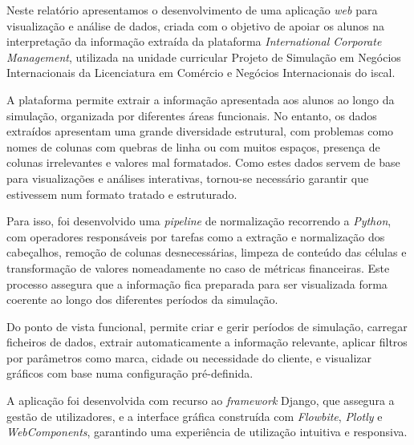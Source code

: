 




Neste relatório apresentamos o desenvolvimento de uma aplicação \textit{web} para visualização e análise de dados, criada com o objetivo de apoiar os alunos na interpretação da informação extraída da plataforma \textit{International Corporate Management}, utilizada na unidade curricular Projeto de Simulação em Negócios Internacionais da Licenciatura em Comércio e Negócios Internacionais do \gls{iscal}.

A plataforma permite extrair a informação apresentada aos alunos ao longo da simulação, organizada por diferentes áreas funcionais. No entanto, os dados extraídos apresentam uma grande diversidade estrutural, com problemas como nomes de colunas com quebras de linha ou com muitos espaços, presença de colunas irrelevantes e valores mal formatados. Como estes dados servem de base para visualizações e análises interativas, tornou-se necessário garantir que estivessem num formato tratado e estruturado. 

Para isso, foi desenvolvido uma \textit{pipeline} de normalização recorrendo a \textit{Python}, com operadores responsáveis por tarefas como a extração e normalização dos cabeçalhos, remoção de colunas desnecessárias, limpeza de conteúdo das células e transformação de valores nomeadamente no caso de métricas financeiras. Este processo assegura que a informação fica preparada para ser visualizada forma coerente ao longo dos diferentes períodos da simulação.

Do ponto de vista funcional, permite criar e gerir períodos de simulação, carregar ficheiros de dados, extrair automaticamente a informação relevante, aplicar filtros por parâmetros como marca, cidade ou necessidade do cliente, e visualizar gráficos com base numa configuração pré-definida.

A aplicação foi desenvolvida com recurso ao \textit{framework} Django, que assegura a gestão de utilizadores, e a interface gráfica construída com \textit{Flowbite}, \textit{Plotly} e \textit{WebComponents}, garantindo uma experiência de utilização intuitiva e responsiva.

